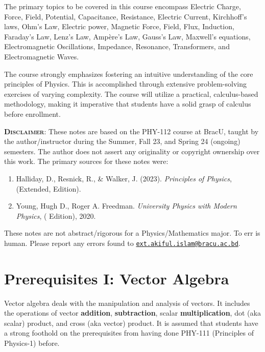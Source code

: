 \documentclass[12pt,b4paper]{article}
\begin{document}
The primary topics to be covered in this course encompass Electric Charge, Force, Field, Potential, Capacitance, Resistance, Electric Current, Kirchhoff's laws, Ohm's Law, Electric power, Magnetic Force, Field, Flux, Induction, Faraday's Law, Lenz's Law, Ampère's Law, Gauss's Law, Maxwell's equations, Electromagnetic Oscillations, Impedance, Resonance, Transformers, and Electromagnetic Waves.

The course strongly emphasizes fostering an intuitive understanding of the core principles of Physics. This is accomplished through extensive problem-solving exercises of varying complexity. The course will utilize a practical, calculus-based methodology, making it imperative that students have a solid grasp of calculus before enrollment.

\textsc{\bf Disclaimer}: These notes are based on the PHY-112 course at BracU, taught by the author/instructor during the Summer, Fall 23, and Spring 24 (ongoing) semesters. The author does not assert any originality or copyright ownership over this work. The primary sources for these notes were:
\begin{enumerate}
\setlength\itemsep{0em}
    \item Halliday, D., Resnick, R., \& Walker, J. (2023). \textit{\textcolor{americanrose}{Principles of Physics}}, (Extended,  Edition).
    \item Young, Hugh D., Roger A. Freedman. \textit{\textcolor{americanrose}{University Physics with Modern Physics}}, ( Edition), 2020.
\end{enumerate}
These notes are not abstract/rigorous for a Physics/Mathematics major. To err is human. Please report any errors found to \href{mailto:ext.akiful.islam@bracu.ac.bd}{\texttt{ext.akiful.islam@bracu.ac.bd}}.
\newpage
\tableofcontents
\thispagestyle{empty}
\newpage
\listoffigures \pagebreak
\newpage
{}
\section*{Prerequisites I: Vector Algebra}
Vector algebra deals with the manipulation and analysis of vectors. It includes the operations of vector \textbf{addition}, \textbf{subtraction}, scalar \textbf{multiplication}, dot (aka scalar) product, and cross (aka vector) product. \textcolor{americanrose}{It is assumed that students have a strong foothold on the prerequisites from having done PHY-111 (Principles of Physics-1) before.}
\thispagestyle{empty}
\end{document}

